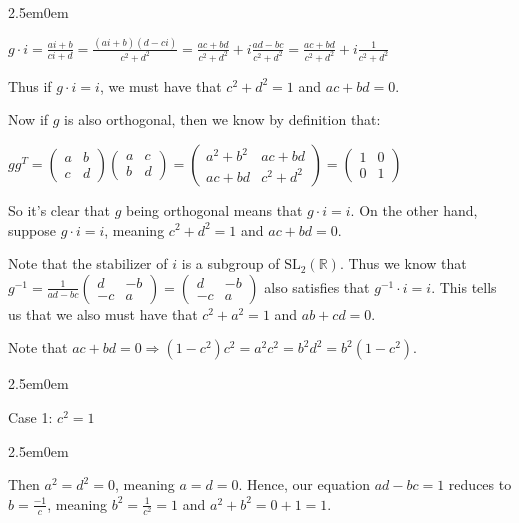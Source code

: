 \documentclass{book}
\newcommand{\exTwoP}{%
   \color{RedViolet}%
   \fontsize{13}{15}\selectfont%
}
\newenvironment{myIndent}{%
   \begin{adjustwidth}{2.5em}{0em}%
}{%
   \end{adjustwidth}%
}
\newcommand{\retTwo}{\hfill\bigbreak}
\begin{document}
\begin{enumerate}
\begin{enumerate}
\begin{myIndent}
			{\centering $g \cdot i = \frac{ai + b}{ci + d} = \frac{(ai + b)(d - ci)}{c^2 + d^2} = \frac{ac+bd}{c^2 + d^2} + i\frac{ad - bc}{c^2 + d^2} = \frac{ac+bd}{c^2 + d^2} + i\frac{1}{c^2 + d^2}$ \retTwo\par}

			Thus if $g \cdot i = i$, we must have that $c^2 + d^2 = 1$ and $ac + bd = 0$.\retTwo

			Now if $g$ is also orthogonal, then we know by definition that:
			
			{\centering $gg^T = \left(\begin{smallmatrix}
				a & b \\ c & d
			\end{smallmatrix}\right)\left(\begin{smallmatrix}
				a & c \\ b & d
			\end{smallmatrix}\right) = \left(\begin{smallmatrix}
				a^2 + b^2 & ac + bd \\ ac + bd & c^2 + d^2
			\end{smallmatrix}\right) = \left(\begin{smallmatrix}
				1 & 0 \\ 0 & 1
			\end{smallmatrix}\right)$\retTwo\par}

			So it's clear that $g$ being orthogonal means that $g \cdot i = i$. On the other hand, suppose $g \cdot i = i$, meaning $c^2 + d^2 = 1$ and $ac + bd = 0$.\retTwo
			
			Note that the stabilizer of $i$ is a subgroup of $\mathrm{SL}_2(\mathbb{R})$. Thus we know that $g^{-1} = \frac{1}{ad-bc}\left(
			\begin{smallmatrix}
				d & -b \\ -c & a
			\end{smallmatrix}\right) = \left(
				\begin{smallmatrix}
					d & -b \\ -c & a
				\end{smallmatrix}\right)$ also satisfies that $g^{-1} \cdot i = i$. This tells us that we also must have that $c^2 + a^2 = 1$ and $ab + cd = 0$.\newpage

				Note that $ac + bd = 0 \Longrightarrow (1 - c^2)c^2 = a^2c^2 = b^2d^2 = b^2(1 - c^2)$.
				
				\begin{myIndent}\exTwoP
					Case 1: $c^2 = 1$
					\begin{myIndent}
						Then $a^2 = d^2 = 0$, meaning $a = d = 0$. Hence, our equation $ad - bc = 1$ reduces to $b = \frac{-1}{c}$, meaning $b^2 = \frac{1}{c^2} = 1$ and $a^2 + b^2 = 0 + 1 = 1$.\retTwo
					\end{myIndent}


\end{myIndent}
\end{myIndent}
\end{enumerate}
\end{enumerate}
\end{document}
